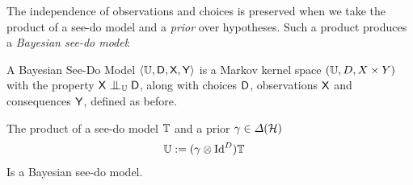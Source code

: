 
The independence of observations and choices is preserved when we take the product of a see-do model and a \emph{prior} over hypotheses. Such a product produces a \emph{Bayesian see-do model}:

\begin{definition}
A Bayesian See-Do Model $\langle\mathbb{U},\mathsf{D},\mathsf{X},\mathsf{Y}\rangle$ is a Markov kernel space $(\mathbb{U},D,X\times Y)$ with the property $\RV{X}\CI_{\kernel{U}}\RV{D}$, along with choices $\mathsf{D}$, observations $\mathsf{X}$ and consequences $\mathsf{Y}$, defined as before.
\end{definition}

\begin{theorem}
The product of a see-do model $\mathbb{T}$ and a prior $\gamma\in \Delta(\mathcal{H})$
\begin{align}
    \mathbb{U} &:= (\gamma\otimes \mathrm{Id}^D)\mathbb{T}
\end{align}
Is a Bayesian see-do model.
\end{theorem}


